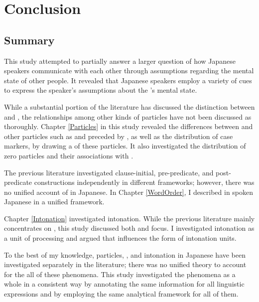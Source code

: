 \chapter{Conclusion}\label{Conclusion}


\section{Summary}

This study attempted to partially answer a larger question of
how Japanese speakers communicate with each other
through assumptions regarding the mental state of other people.
It revealed that Japanese speakers employ a variety of cues to express the speaker's assumptions about the 's mental state.

While a substantial portion of the literature has discussed the distinction between  and ,
the relationships among other kinds of particles have not been discussed as thoroughly.
Chapter \ref{Particles} in this study revealed the differences between  and other  particles such as  and  preceded by ,
as well as the distribution of case markers,
by drawing a  of these particles.
It also investigated the distribution of zero particles and their associations with .

The previous literature investigated clause-initial, pre-predicate, and post-pred\-i\-cate constructions %
independently in different frameworks;
however, there was no unified account of  in Japanese.
In Chapter \ref{WordOrder},
I described  in spoken Japanese in a unified framework.

Chapter \ref{Intonation} investigated intonation.
While the previous literature mainly concentrates on ,
this study discussed both  and focus.
I investigated intonation as a unit of processing and
argued that  influences the form of intonation units.

To the best of my knowledge,
particles, , and intonation in Japanese have been investigated separately in the literature;
there was no unified theory to account for the all of these phenomena.
This study investigated the phenomena as a whole in a consistent way
by annotating the same information for all linguistic expressions and
by employing the same analytical framework for all of them.



